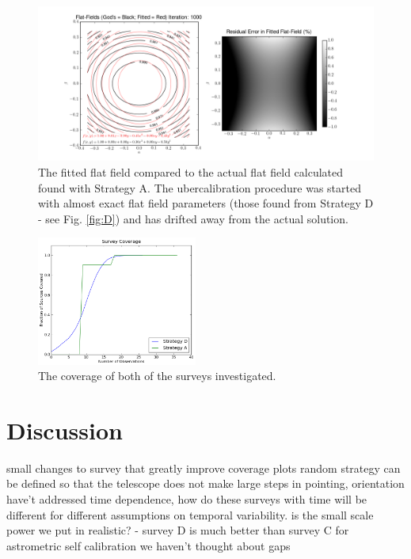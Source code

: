 \documentclass[manuscript]{aastex}
\begin{document}
\begin{figure}[ht]
\begin{center}
\includegraphics[width=\textwidth]{A_1000_ff.png}
\end{center}
\caption{The fitted flat field compared to the actual flat field calculated found with Strategy A. The ubercalibration procedure was started with almost exact flat field parameters (those found from Strategy D - see Fig. \ref{fig:D}) and has drifted away from the actual solution. \label{fig:A}}
\end{figure}

\begin{figure}[ht]
\begin{center}
\includegraphics[width=0.47\textwidth]{coverage.png}
\end{center}
\caption{The coverage of both of the surveys investigated. \label{fig:coverage}}
\end{figure}

\section{Discussion}
small changes to survey that greatly improve coverage plots
random strategy can be defined so that the telescope does not make large steps in pointing, orientation
have't addressed time dependence, how do these surveys with time will be different for different assumptions on temporal variability. 
is the small scale power we put in realistic?
- survey D is much better than survey C for astrometric self calibration 
we haven't thought about gaps
\end{document}

